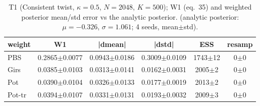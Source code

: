 \begin{table}[ht]
\centering
\caption{T1 (Consistent twist, $\kappa=0.5$, $N=2048$, $K=500$); W1 (eq.~35) and weighted posterior mean/std error vs the analytic posterior. (analytic posterior: $\mu=-0.326$, $\sigma=1.061$; 4 seeds, mean$\pm$std).}
\label{tab:toy_t1_consistent}
\begin{tabular}{lccccc}
\toprule
weight & W1 & |dmean| & |dstd| & ESS & resamp \\
\midrule
PBS & 0.2865$\pm$0.0077 & 0.0943$\pm$0.0186 & 0.3009$\pm$0.0109 & 1743$\pm$12 & 0$\pm$0 \\
Girs & 0.0385$\pm$0.0103 & 0.0313$\pm$0.0141 & 0.0162$\pm$0.0031 & 2005$\pm$2 & 0$\pm$0 \\
Pot & 0.0390$\pm$0.0104 & 0.0326$\pm$0.0133 & 0.0177$\pm$0.0019 & 2013$\pm$2 & 0$\pm$0 \\
Pot-tr & 0.0394$\pm$0.0107 & 0.0331$\pm$0.0131 & 0.0193$\pm$0.0032 & 2009$\pm$3 & 0$\pm$0 \\
\bottomrule
\end{tabular}
\end{table}
